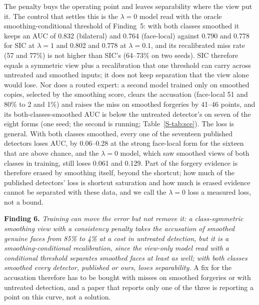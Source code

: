 \documentclass[conference]{IEEEtran}
\begin{document}
The penalty buys the operating point and leaves separability where the view put it. The control that settles this is the $\lambda=0$ model read with
the oracle smoothing-conditional threshold of Finding~5: with both classes smoothed it keeps an AUC of 0.832 (bilateral) and
0.764 (face-local) against 0.790 and 0.778 for SIC at $\lambda=1$ and 0.802 and 0.778 at $\lambda=0.1$, and its
recalibrated miss rate (57 and 77\%) is not higher than SIC's (64--73\% on two seeds).
SIC therefore equals a symmetric view plus a recalibration that one threshold can carry across untreated and smoothed
inputs; it does not keep separation that the view alone would lose. Nor does a routed expert: a second model trained only on
smoothed copies, selected by the smoothing score, clears the accusation (face-local 51 and 80\% to 2 and 1\%) and raises the
miss on smoothed forgeries by 41--46 points, and its both-classes-smoothed AUC is below the untreated detector's on seven of
the eight forms (one seed; the second is running; Table~\ref{S-tab:sce}).
The loss is general. With both classes smoothed, every one of the seventeen published detectors loses AUC, by 0.06--0.28 at
the strong face-local form for the sixteen that are above chance, and the $\lambda=0$ model, which saw smoothed views of both
classes in training, still loses 0.061 and 0.129.
Part of the forgery evidence is therefore erased by smoothing itself, beyond the shortcut; how much of the published
detectors' loss is shortcut saturation and how much is erased evidence cannot be separated with these data, and we call the
$\lambda=0$ loss a measured loss, not a bound.

\textbf{Finding 6.} \emph{Training can move the error but not remove it: a class-symmetric smoothing view with a
consistency penalty takes the accusation of smoothed genuine faces from 85\% to 4\% at a cost in untreated detection, but it is
a smoothing-conditional recalibration, since the view-only model read with a conditional threshold separates smoothed
faces at least as well; with both classes smoothed every detector, published or ours, loses separability.}
A fix for the accusation therefore has to be bought with misses on smoothed forgeries or with untreated detection, and a
paper that reports only one of the three is reporting a point on this curve, not a solution.
\end{document}
